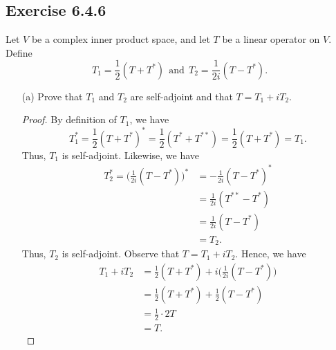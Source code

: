 \subsection*{Exercise 6.4.6} Let \( V  \) be a complex inner product space, and let \( T  \) be a linear operator on \( V  \). Define 
\[  {T}_{1} = \frac{ 1 }{ 2 }  (T + T^{*}) \ \ \text{and} \ \ {T}_{2} = \frac{ 1 }{ 2i }  (T - T^{*}). \]
\begin{enumerate}
    \item[(a)] Prove that \( {T}_{1}  \) and \( {T}_{2}  \) are self-adjoint and that \( T = {T}_{1} + i {T}_{2} \).
        \begin{proof}
            By definition of \( {T}_{1} \), we have
            \[  {T}_{1}^{*} = \frac{ 1 }{ 2 }  (T + T^{*})^{*} = \frac{ 1 }{ 2 }  ( T^{*} + T^{* * }) = \frac{ 1 }{ 2 }  (T  + T^{*}) = {T}_{1}. \]
            Thus, \( {T}_{1} \) is self-adjoint. Likewise, we have
            \begin{align*}
            {T}_{2}^{*} = \Big(  \frac{ 1 }{ 2i }  (T - T^{*}) \Big)^{*} &=  - \frac{ 1 }{ 2i } (T - T^{*})^{*} \\  
                                                                         &=  \frac{ 1 }{ 2i }  ( T^{* * } -  T^{*}) \\  
                                                                         &=  \frac{ 1 }{ 2i }  ( T -  T^{*}) \\  
                                                                         &= {T}_{2}.
\end{align*}
Thus, \( {T}_{2} \) is self-adjoint. Observe that \( T = {T}_{1} + i {T}_{2} \). Hence, we have
\begin{align*}
    {T}_{1} + i {T}_{2} &= \frac{ 1 }{ 2 }  ( T  + T^{*}) + i \Big(  \frac{ 1 }{ 2i }  (T - T^{*}) \Big)   \\
                        &= \frac{ 1 }{ 2 }  (T + T^{*}) + \frac{ 1 }{ 2 } (T - T^{*}) \\
                        &= \frac{ 1 }{ 2 } \cdot  2 T  \\
                        &= T.
\end{align*}


\end{proof}
\end{enumerate}
